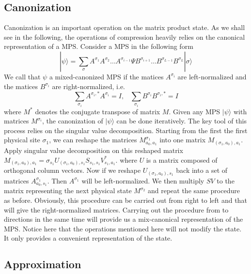 \documentclass[english]{article}[12pt]
\begin{document}
\subsection{Canonization}
Canonization is an important operation on the matrix product state. As we shall see in the following, the operations of compression heavily relies on the canonical representation of a MPS. Consider a MPS in the following form
\[
|\psi \rangle =\sum_{\sigma}A^{\sigma_1}A^{\sigma_2}\dots A^{\sigma_{i-1}}\Psi B^{\sigma_{i+1}}\dots B^{\sigma_{L-1}} B^{\sigma_L} |\sigma\rangle
\]
We call that $\psi$ a mixed-canonized MPS if the matices $A^{\sigma_i}$ are left-normalized and the matices $B^{\sigma_i}$ are right-normalized, i.e.
\[
\sum_{\sigma_i} A^{\sigma_i,*}A^{\sigma_i} = I,\;\;\;\sum_{\sigma_i} B^{\sigma_i}B^{\sigma_i,*}=I
\]
where $M^*$ denotes the conjugate transpose of matrix $M$. Given any MPS $|\psi\rangle$ with matrices $M^{\sigma_i}$, the canonization of $|\psi\rangle$ can be done iteratively. The key tool of this process relies on the singular value decomposition. Starting from the first the first physical site $\sigma_1$, we can reshape the matrices $M_{a_0,a_1}^{\sigma_1}$ into one matrix $M_{(\sigma_1,a_0),a_1}$. Apply singular value decomposition on this reshaped matrix $M_{(\sigma_1,a_0),a_1}=\sigma_{s_1} U_{(\sigma_1,a_0),s_1} S_{s_1,s_1} V^{*}_{s_1,a_1}$. where $U$ is a matrix composed of orthogonal column vectors. Now if we reshape $U_{(\sigma_1,a_0),s_1}$ back into a set of matrices $A_{a_0,s_1}^{\sigma_1}$. Then $A^{\sigma_1}$ will be left-normalized. We then multiply $SV$ to the matrix representing the next physical state $M^{\sigma_2}$ and repeat the same procedure as before. Obviously, this procedure can be carried out from right to left and that will give the right-normalized matrices.
Carrying out the procedure from to directions in the same time will provide us a mix-canonical representation of the MPS. Notice here that the operations mentioned here will not modify the state. It only provides a convenient representation of the state.

\subsection{Approximation}
\end{document}
